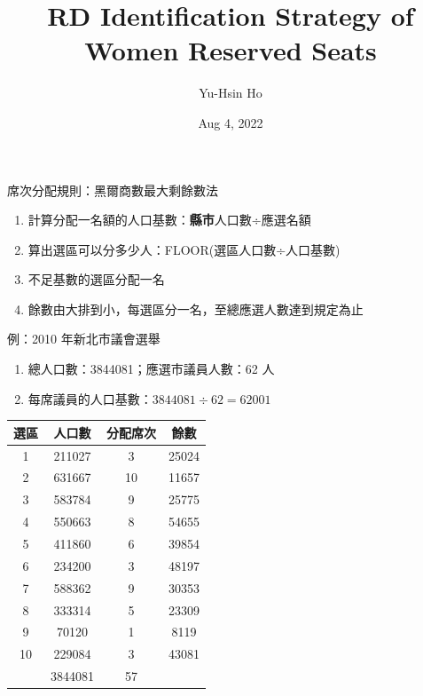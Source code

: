 \documentclass[
  10pt,
  ignorenonframetext,
  aspectratio=43,
]{beamer}
\title{RD Identification Strategy of Women Reserved Seats}
\author{Yu-Hsin Ho}
\date{Aug 4, 2022}
\institute{Department of Economics, National Taiwan University}
\providecommand{\tightlist}{%
  \setlength{\itemsep}{0pt}\setlength{\parskip}{0pt}}
\begin{document}
\frame{\titlepage}

\begin{frame}{席次分配規則：黑爾商數最大剩餘數法}
\protect\hypertarget{ux5e2dux6b21ux5206ux914dux898fux5247ux9ed1ux723eux5546ux6578ux6700ux5927ux5269ux9918ux6578ux6cd5}{}
\begin{enumerate}
\tightlist
\item
  計算分配一名額的人口基數：\textbf{縣市}人口數÷應選名額
\item
  算出選區可以分多少人：FLOOR(選區人口數÷人口基數)
\item
  不足基數的選區分配一名
\item
  餘數由大排到小，每選區分一名，至總應選人數達到規定為止
\end{enumerate}
\end{frame}

\begin{frame}
\begin{block}{例：2010 年新北市議會選舉}
\protect\hypertarget{ux4f8b2010-ux5e74ux65b0ux5317ux5e02ux8b70ux6703ux9078ux8209}{}
\begin{enumerate}
\tightlist
\item
  總人口數：3844081；應選市議員人數：62 人
\item
  每席議員的人口基數：\(3844081 \div 62 = 62001\)
\end{enumerate}

\begin{longtable}[]{@{}cccc@{}}
\toprule()
選區 & 人口數 & 分配席次 & 餘數 \\
\midrule()
\endhead
1 & 211027 & 3 & 25024 \\
2 & 631667 & 10 & 11657 \\
3 & 583784 & 9 & 25775 \\
4 & 550663 & 8 & 54655 \\
5 & 411860 & 6 & 39854 \\
6 & 234200 & 3 & 48197 \\
7 & 588362 & 9 & 30353 \\
8 & 333314 & 5 & 23309 \\
9 & 70120 & 1 & 8119 \\
10 & 229084 & 3 & 43081 \\
\midrule()
& 3844081 & 57 & \\
\bottomrule()
\end{longtable}
\end{block}
\end{frame}
\end{document}
